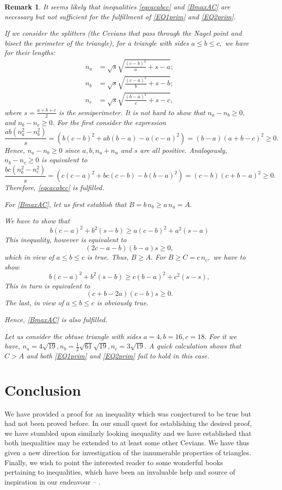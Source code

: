 \documentclass[a4paper,12pt]{article}
\newtheorem{remark}{Remark}
\begin{document}
\begin{remark} It seems likely that inequalities  \eqref{eqcacabcc} and \eqref{BmaxAC} are necessary but not sufficient for the fulfillment of \eqref{EQ1prim} and \eqref{EQ2prim}.

If we consider the splitters (the Cevians that pass through the Nagel point and bisect the perimeter of the triangle), for a triangle with sides $a\leq b \leq c,$ we have for their lengths:
\begin{align*}
n_a&=\sqrt{s}\sqrt{\frac{(c-b)^2}{a}+s-a};\\
n_b&=\sqrt{s}\sqrt{\frac{(c-a)^2}{b}+s-b};\\
n_c&=\sqrt{s}\sqrt{\frac{(b-a)^2}{c}+s-c},
\end{align*}
where $s=\frac{a+b+c}{2}$ is the semiperimeter.
It is not hard to show that $n_a-n_b \geq 0,$ and $n_b-n_c \geq 0.$ For the first consider the expression
\[
\frac{ab(n_a^2-n_b^2)}{s}=(b(c-b)^2+ab(b-a)-a(c-a)^2)=(b-a)(a+b-c)^2 \geq 0.
\]
Hence, $n_a-n_b \geq 0$ since $a,b,n_a+n_n$ and $s$ are all positive. Analogously, $n_b-n_c \geq 0$ is equivalent to
\[
\frac{bc(n_b^2-n_c^2)}{s}=(c(c-a)^2+bc(c-b)-b(b-a)^2)=(c-b)(c+b-a)^2 \geq 0.
\]
Therefore, \eqref{eqcacabcc} is fulfilled.

For \eqref{BmaxAC}, let us first establish that $B=b\, n_b \geq a\, n_a = A.$

We have to show that 
\[
b(c-a)^2+b^2(s-b) \geq a(c-b)^2+a^2(s-a)
\]
This inequality, however is equivalent to 
\[
(2c-a-b)(b-a)s \geq 0,
\]
which in view of $a\leq b \leq c$ is true. Thus, $B \geq A.$
For $B \geq  C= c\, n_c,$ we have to show
\[
b(c-a)^2+b^2(s-b) \geq c(b-a)^2+c^2(s-s),
\]
This in turn is equivalent to
\[
(c+b-2a)(c-b)s \geq 0.
\]
The last, in view of $a\leq b \leq c$ is obviously true.

Hence, \eqref{BmaxAC} is also fulfilled.

Let us consider the obtuse triangle with sides $a=4, b=16, c=18.$ For it we have,
$n_a=4\sqrt{19},n_b=\frac{1}{2}\sqrt{61}\sqrt{19}, n_c=3\sqrt{19}.$ A quick calculation shows that $C>A$ and both \eqref{EQ1prim} and  \eqref{EQ2prim} fail to hold in this case.
\end{remark}

\section{Conclusion}
We have provided a proof for an inequality which was conjectured to be true but had not been proved before. In our small quest for establishing the desired proof, we have stumbled upon similarly looking inequality and we have established that both inequalities may be extended to at least some other Cevians. We have thus given a new direction for investigation of the innumerable properties of triangles. Finally, we wish to point the interested reader to some wonderful books pertaining to inequalities, which have been an invaluable help and source of inspiration in our endeavour -- \cite{less_is_more,secrets,major}.  
\end{document}
